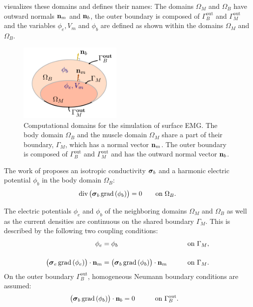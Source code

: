  visualizes these domains and defines their names: The domains $\Omega_M$ and $\Omega_B$ have outward normals $\textbf{n}_m$ and $\textbf{n}_b$, the outer boundary is composed of $\Gamma_B^\text{out}$ and $\Gamma_M^\text{out}$ and the variables $\phi_e,V_m$ and $\phi_b$ are defined as shown within the domains $\Omega_M$ and $\Omega_B$.

\begin{figure}[t]
  \centering
  \includegraphics[width=50mm]{images/theory/computational_domains.png}
  \caption{Computational domains for the simulation of surface EMG. The body domain $\Omega_B$ and the muscle domain $\Omega_M$ share a part of their boundary, $\Gamma_M$, which has a normal vector $\textbf{n}_m$. The outer boundary is composed of $\Gamma_B^\text{out}$ and $\Gamma_M^\text{out}$ and has the outward normal vector $\textbf{n}_b$. }
  \label{fig:body_domain_visualization}
\end{figure}

The work of \cite{Mordhorst2015} proposes an isotropic conductivity $\boldsymbol{\sigma}_b$ and a harmonic electric potential $\phi_b$ in the body domain $\Omega_B$:
\begin{align}\label{eq:body}
  \hbox{div} \, \big(\boldsymbol{\sigma}_b\,\hbox{grad} \, (\phi_b)\big) = 0 \qquad \text{on } \Omega_B.
\end{align}

The electric potentials $\phi_e$ and $\phi_b$ of the neighboring domains $\Omega_M$ and $\Omega_B$ as well as the current densities are continuous on the shared boundary $\Gamma_M$. This is described by the following two coupling conditions:
\begin{subequations}\label{eq:body_domain_coupling}
  \begin{align}
    \phi_e &= \phi_b  \qquad &&\text{on } \Gamma_M, \label{eq:body_domain_bc1}   \\[4mm]
    \big(\boldsymbol{\sigma}_e\, \hbox{grad} \,( \phi_e)\big)\cdot \textbf{n}_m &= \big(\boldsymbol{\sigma}_b\, \hbox{grad} \,(  \phi_b)\big)\cdot \textbf{n}_m \qquad &&\text{on } \Gamma_M.\label{eq:body_domain_bc2}
  \end{align}
\end{subequations}
% 
On the outer boundary $\Gamma_B^\text{out}$, homogeneous Neumann boundary conditions are assumed:
\begin{align}%
  \big(\bfsigma_b\, \grad( \phi_b)\big)\cdot \bfn_b &= 0 \qquad &&\text{on } \Gamma^\text{out}_B.\label{eq:body_domain_bc3}
\end{align}

